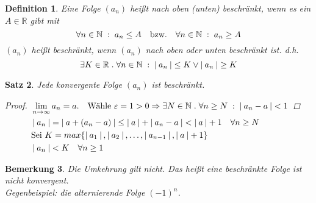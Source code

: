 \documentclass[a4paper,titlepage,oneside]{article}
\def\N{\ensuremath{\mathbb{N}} }
\def\R{\ensuremath{\mathbb{R}} }
\renewcommand{\epsilon}{\ensuremath{\varepsilon} }
\def\lor{\ensuremath{\vee}}
\def\sp{\hspace{0,1cm}}
\def\spdot{\sp.\sp}
\def\spcolon{\sp:\sp}
\renewcommand{\liminf}[2][n]{\ensuremath{\lim\limits_{#1 \rightarrow \infty}{#2}}}
\newcommand{\abs}[1]{\ensuremath{\left|\:#1\:\right|}}
\theoremstyle{thmstyle}
\newtheorem{satz}{Satz}[section]
\newtheorem{defi}[satz]{Definition}
\newtheorem{bem}[satz]{Bemerkung}
\theoremstyle{subthmstyle}
\begin{document}
\begin{defi}
Eine Folge \((a_n)\) heißt nach oben (unten) beschränkt, wenn es ein \(A \in \R\) gibt mit \[\forall n \in \N \spcolon a_n \le A \quad \text{bzw.} \quad \forall n \in \N \spcolon a_n \ge A\]
\((a_n)\) heißt beschränkt, wenn \((a_n)\) nach oben oder unten beschränkt ist. d.h. \[\exists K \in \R \spdot \forall n \in \N \spcolon \abs{a_n} \le K \lor \abs{a_n} \ge K \]
\end{defi}

\begin{satz}
Jede konvergente Folge \((a_n)\) ist beschränkt.
\begin{proof}
\begin{math} \displaystyle
\begin{aligned}[t]
	&\liminf{a_n} = a. \quad \text{Wähle } \epsilon = 1 > 0 \Rightarrow \exists N \in \N \spdot \forall n \ge N \spcolon \abs{a_n - a} < 1 \\
	&\abs{a_n} = \abs{a + (a_n - a)} \le \abs{a} + \abs{a_n- a} < \abs{a} + 1 \quad \forall n \ge N \\
	&\text{Sei } K = max\{\abs{a_1}, \abs{a_2}, \dots, \abs{a_{n-1}}, \abs{a}+1\} \\
	&\abs{a_n} < K \quad \forall n \ge 1 \\
\end{aligned}
\end{math}
\end{proof}
\end{satz}

\begin{bem}
Die Umkehrung gilt nicht. Das heißt eine beschränkte Folge ist nicht konvergent.\\
\textit{Gegenbeispiel}: die alternierende Folge $(-1)^n$.
\end{bem}
\end{document}
